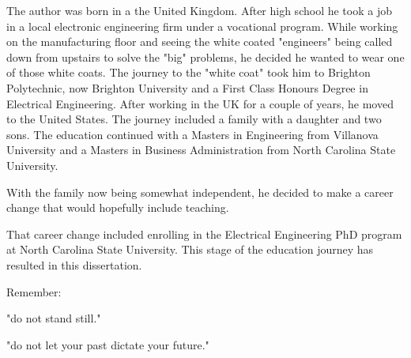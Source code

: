 \begin{biography}
The author was born in a the United Kingdom.  After high school he took a job in a local electronic engineering firm
under a vocational program.
While working on the manufacturing floor and seeing the white coated "engineers" being called down from upstairs to solve the "big" problems, he decided he wanted to wear one
of those white coats.
The journey to the "white coat" took him to Brighton Polytechnic, now Brighton University and a First Class Honours Degree in Electrical Engineering.
After working in the UK for a couple of years, he moved to the United States.
The journey included a family with a daughter and two sons.
The education continued with a Masters in Engineering from Villanova University and a Masters in Business Administration from North
Carolina State University.

With the family now being somewhat independent, he decided to make a career change that would hopefully include teaching.

That career change included enrolling in the Electrical Engineering PhD program at North
Carolina State University. This stage of the education journey has resulted in this dissertation.




Remember:

"do not stand still."  

"do not let your past dictate your future."


\end{biography}

